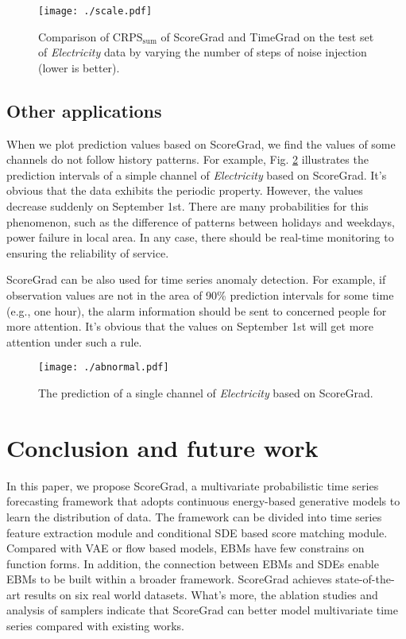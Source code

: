 \begin{figure}[t]
	\centering
	\texttt{[image: ./scale.pdf]} 
	\caption{Comparison of $\text{CRPS}_{\text{sum}}$ of ScoreGrad and TimeGrad on the test set of \textit{Electricity} data by varying the number of steps of noise injection (lower is better).} %
	\label{scale_comp}
\end{figure}

\subsection{Other applications}
When we plot prediction values based on ScoreGrad, we find the values of some channels do not follow history patterns. For example, Fig. \ref{abnormal} illustrates the prediction intervals of a simple channel of \textit{Electricity} based on ScoreGrad. It's obvious that the data exhibits the periodic property. However, the values decrease suddenly on September 1st. There are many probabilities for this phenomenon, such as the difference of patterns between holidays and weekdays, power failure in local area. In any case, there should be real-time monitoring to ensuring the reliability of service. 

ScoreGrad can be also used for time series anomaly detection. For example, if observation values are not in the area of 90\% prediction intervals for some time (e.g., one hour), the alarm information should be sent to concerned people for more attention. It's obvious that the values on September 1st will get more attention under such a rule.

\begin{figure}[t]
	\centering
	\texttt{[image: ./abnormal.pdf]} 
	\caption{The prediction of a single channel of \textit{Electricity} based on ScoreGrad. } %
	\label{abnormal}
\end{figure}

\section{Conclusion and future work}
In this paper, we propose ScoreGrad, a multivariate probabilistic time series forecasting framework that adopts continuous energy-based generative models to learn the distribution of data. The framework can be divided into time series feature extraction module and conditional SDE based score matching module. Compared with VAE or flow based models, EBMs have few constrains on function forms. In addition, the connection between EBMs and SDEs enable EBMs to be built within a broader framework. ScoreGrad achieves state-of-the-art results on six real world datasets. What's more, the ablation studies and analysis of samplers indicate that ScoreGrad can better model multivariate time series compared with existing works.

